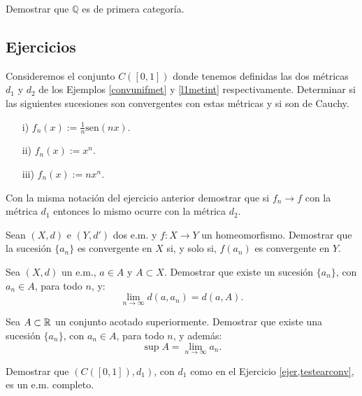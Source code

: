  
 \begin{ejercicio}{} Demostrar que $\mathbb{Q}$ es de primera categoría.
   \end{ejercicio}






\subsection{Ejercicios}

\begin{ejercicio}{}\label{ejer,testearconv} Consideremos el conjunto $C([0,1])$ donde
tenemos definidas las dos métricas $d_1$ y $d_2$ de los Ejemplos
\vref{convunifmet} y \vref{l1metint} respectivamente. Determinar
si las siguientes sucesiones son convergentes con estas métricas
y si son de Cauchy.
\begin{itemize}
    \item[i)] $f_n(x):=\frac1n\text{sen}(nx)$.
    \item[ii)] $f_n(x):=x^n$.
    \item[iii)]$f_n(x):=nx^n$.
\end{itemize}
\end{ejercicio}
\begin{ejercicio}{} Con la misma notación del ejercicio anterior
demostrar que si $f_n\to f$ con la métrica  $d_1$ entonces lo
mismo ocurre con la métrica $d_2$.
\end{ejercicio}

\begin{ejercicio}{} Sean $(X,d)$ e $(Y,d')$ dos e.m. y $f:X\to Y$ un homeomorfismo.
Demostrar que la sucesión $\{a_n\}$ es convergente en $X$ si, y
solo si, $f(a_n)$ es convergente en $Y$.
\end{ejercicio}



\begin{ejercicio}{} Sea $(X,d)$ un e.m., $a\in A$ y $A\subset X$. Demostrar
que existe un sucesión $\{a_n\}$, con $a_n\in A$, para todo $n$,
y:
\[\lim\limits_{n\to\infty}d(a,a_n)=d(a,A).\]
\end{ejercicio}

\begin{ejercicio}{} Sea $A\subset \mathbb{R}$ un conjunto acotado
superiormente. Demostrar que existe una sucesión $\{a_n\}$, con
$a_n\in A$, para todo $n$, y además:
\[
    \sup A=\lim\limits_{n\to\infty} a_n.
\]
\end{ejercicio}

\begin{ejercicio}{} Demostrar que $(C([0,1]),d_1)$, con $d_1$ como
en el Ejercicio \ref{ejer,testearconv}, es un e.m. completo.
\end{ejercicio}

